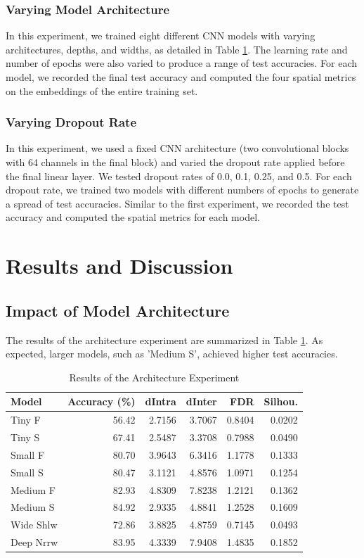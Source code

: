 \documentclass[conference]{IEEEtran}
\begin{document}
\subsubsection{Varying Model Architecture}
In this experiment, we trained eight different CNN models with varying architectures, depths, and widths, as detailed in Table \ref{tab:arch_results}. The learning rate and number of epochs were also varied to produce a range of test accuracies. For each model, we recorded the final test accuracy and computed the four spatial metrics on the embeddings of the entire training set.

\subsubsection{Varying Dropout Rate}
In this experiment, we used a fixed CNN architecture (two convolutional blocks with 64 channels in the final block) and varied the dropout rate applied before the final linear layer. We tested dropout rates of 0.0, 0.1, 0.25, and 0.5. For each dropout rate, we trained two models with different numbers of epochs to generate a spread of test accuracies. Similar to the first experiment, we recorded the test accuracy and computed the spatial metrics for each model.

\section{Results and Discussion}

\subsection{Impact of Model Architecture}
The results of the architecture experiment are summarized in Table \ref{tab:arch_results}. As expected, larger models, such as 'Medium S', achieved higher test accuracies.

\begin{table}[htbp]
\caption{Results of the Architecture Experiment}
\begin{center}
\begin{tabular}{lrrrrr}
\toprule
\textbf{Model} & \textbf{Accuracy (\%)} & \textbf{dIntra} & \textbf{dInter} & \textbf{FDR} & \textbf{Silhou.} \\
\midrule
Tiny F & 56.42 & 2.7156 & 3.7067 & 0.8404 & 0.0202 \\
Tiny S & 67.41 & 2.5487 & 3.3708 & 0.7988 & 0.0490 \\
Small F & 80.70 & 3.9643 & 6.3416 & 1.1778 & 0.1333 \\
Small S & 80.47 & 3.1121 & 4.8576 & 1.0971 & 0.1254 \\
Medium F & 82.93 & 4.8309 & 7.8238 & 1.2121 & 0.1362 \\
Medium S & 84.92 & 2.9335 & 4.8841 & 1.2528 & 0.1609 \\
Wide Shlw & 72.86 & 3.8825 & 4.8759 & 0.7145 & 0.0493 \\
Deep Nrrw & 83.95 & 4.3339 & 7.9408 & 1.4835 & 0.1852 \\
\bottomrule
\end{tabular}
\label{tab:arch_results}
\end{center}
\end{table}
\end{document}
